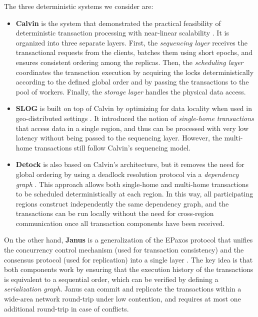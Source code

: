 The three deterministic systems we consider are:
\begin{itemize}
    \item \textbf{Calvin} is the system that demonstrated the practical feasibility of deterministic transaction processing with near-linear scalability \cite{thomson2012calvin}. It is organized into three separate layers. First, the \textit{sequencing layer} receives the transactional requests from the clients, batches them using short epochs, and ensures consistent ordering among the replicas. Then, the \textit{scheduling layer} coordinates the transaction execution by acquiring the locks deterministically according to the defined global order and by passing the transactions to the pool of workers. Finally, the \textit{storage layer} handles the physical data access.
    \item \textbf{SLOG} is built on top of Calvin by optimizing for data locality when used in geo-distributed settings \cite{ren2019slog}. It introduced the notion of \textit{single-home transactions} that access data in a single region, and thus can be processed with very low latency without being passed to the sequencing layer. However, the multi-home transactions still follow Calvin's sequencing model.
    \item \textbf{Detock} is also based on Calvin's architecture, but it removes the need for global ordering by using a deadlock resolution protocol via a \textit{dependency graph} \cite{nguyen2023detock}. This approach allows both single-home and multi-home transactions to be scheduled deterministically at each region. In this way, all participating regions construct independently the same dependency graph, and the transactions can be run locally without the need for cross-region communication once all transaction components have been received.
\end{itemize}

On the other hand, \textbf{Janus} is a generalization of the EPaxos protocol that unifies the concurrency control mechanism (used for transaction consistency) and the consensus protocol (used for replication) into a single layer \cite{mu2016consolidating}. The key idea is that both components work by ensuring that the execution history of the transactions is equivalent to a sequential order, which can be verified by defining a \textit{serialization graph}. Janus can commit and replicate the transactions within a wide-area network round-trip under low contention, and requires at most one additional round-trip in case of conflicts.


